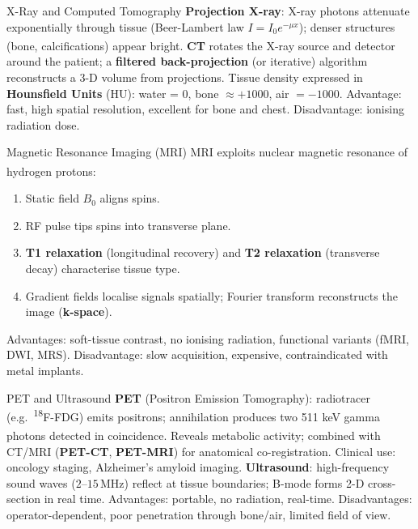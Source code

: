 \begin{v3topic}{X-Ray and Computed Tomography}
    \textbf{Projection X-ray}: X-ray photons attenuate exponentially through tissue (Beer-Lambert law $I = I_0 e^{-\mu x}$); denser structures (bone, calcifications) appear bright\textsuperscript{\cite[][pp.~135--180]{bushbergEssentialPhysicsMedicalImaging2020}}.
\visualseparator
    \textbf{CT} rotates the X-ray source and detector around the patient; a \textbf{filtered back-projection} (or iterative) algorithm reconstructs a 3-D volume from projections.
    Tissue density expressed in \textbf{Hounsfield Units} (HU): water = 0, bone $\approx +1000$, air $= -1000$.
    Advantage: fast, high spatial resolution, excellent for bone and chest.
    Disadvantage: ionising radiation dose.

\end{v3topic}
\begin{v3topic}{Magnetic Resonance Imaging (MRI)}
    MRI exploits nuclear magnetic resonance of hydrogen protons\textsuperscript{\cite[][pp.~270--320]{bushbergEssentialPhysicsMedicalImaging2020}}:
    \begin{enumerate}
        \item Static field $B_0$ aligns spins.
        \item RF pulse tips spins into transverse plane.
        \item \textbf{T1 relaxation} (longitudinal recovery) and \textbf{T2 relaxation} (transverse decay) characterise tissue type.
        \item Gradient fields localise signals spatially; Fourier transform reconstructs the image (\textbf{k-space}).
    \end{enumerate}
    Advantages: soft-tissue contrast, no ionising radiation, functional variants (fMRI, DWI, MRS).
    Disadvantage: slow acquisition, expensive, contraindicated with metal implants.

\end{v3topic}
\begin{v3topic}{PET and Ultrasound}
    \textbf{PET} (Positron Emission Tomography): radiotracer (e.g.\ \textsuperscript{18}F-FDG) emits positrons; annihilation produces two 511 keV gamma photons detected in coincidence\textsuperscript{\cite[][pp.~590--630]{bushbergEssentialPhysicsMedicalImaging2020}}.
    Reveals metabolic activity; combined with CT/MRI (\textbf{PET-CT}, \textbf{PET-MRI}) for anatomical co-registration.
    Clinical use: oncology staging, Alzheimer's amyloid imaging.
\visualseparator
    \textbf{Ultrasound}: high-frequency sound waves ($2$--$15\,\text{MHz}$) reflect at tissue boundaries; B-mode forms 2-D cross-section in real time.
    Advantages: portable, no radiation, real-time. Disadvantages: operator-dependent, poor penetration through bone/air, limited field of view.

\end{v3topic}
